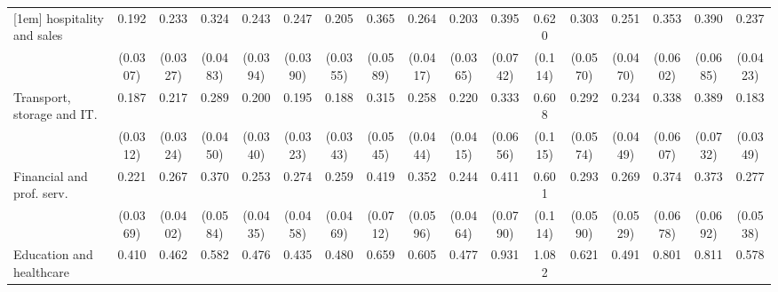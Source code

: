 {\begin{tabular}{l*{16}{c}}
[1em]
hospitality and sales&       0.192\sym{***}&       0.233\sym{***}&       0.324\sym{***}&       0.243\sym{***}&       0.247\sym{***}&       0.205\sym{***}&       0.365\sym{***}&       0.264\sym{***}&       0.203\sym{***}&       0.395\sym{***}&       0.620\sym{**} &       0.303\sym{***}&       0.251\sym{***}&       0.353\sym{***}&       0.390\sym{***}&       0.237\sym{***}\\
                    &    (0.0307)         &    (0.0327)         &    (0.0483)         &    (0.0394)         &    (0.0390)         &    (0.0355)         &    (0.0589)         &    (0.0417)         &    (0.0365)         &    (0.0742)         &     (0.114)         &    (0.0570)         &    (0.0470)         &    (0.0602)         &    (0.0685)         &    (0.0423)         \\
[1em]
Transport, storage and IT.&       0.187\sym{***}&       0.217\sym{***}&       0.289\sym{***}&       0.200\sym{***}&       0.195\sym{***}&       0.188\sym{***}&       0.315\sym{***}&       0.258\sym{***}&       0.220\sym{***}&       0.333\sym{***}&       0.608\sym{**} &       0.292\sym{***}&       0.234\sym{***}&       0.338\sym{***}&       0.389\sym{***}&       0.183\sym{***}\\
                    &    (0.0312)         &    (0.0324)         &    (0.0450)         &    (0.0340)         &    (0.0323)         &    (0.0343)         &    (0.0545)         &    (0.0444)         &    (0.0415)         &    (0.0656)         &     (0.115)         &    (0.0574)         &    (0.0449)         &    (0.0607)         &    (0.0732)         &    (0.0349)         \\
[1em]
Financial and prof. serv.&       0.221\sym{***}&       0.267\sym{***}&       0.370\sym{***}&       0.253\sym{***}&       0.274\sym{***}&       0.259\sym{***}&       0.419\sym{***}&       0.352\sym{***}&       0.244\sym{***}&       0.411\sym{***}&       0.601\sym{**} &       0.293\sym{***}&       0.269\sym{***}&       0.374\sym{***}&       0.373\sym{***}&       0.277\sym{***}\\
                    &    (0.0369)         &    (0.0402)         &    (0.0584)         &    (0.0435)         &    (0.0458)         &    (0.0469)         &    (0.0712)         &    (0.0596)         &    (0.0464)         &    (0.0790)         &     (0.114)         &    (0.0590)         &    (0.0529)         &    (0.0678)         &    (0.0692)         &    (0.0538)         \\
[1em]
Education and healthcare&       0.410\sym{***}&       0.462\sym{***}&       0.582\sym{**} &       0.476\sym{***}&       0.435\sym{***}&       0.480\sym{***}&       0.659\sym{*}  &       0.605\sym{**} &       0.477\sym{***}&       0.931         &       1.082         &       0.621\sym{*}  &       0.491\sym{***}&       0.801         &       0.811         &       0.578\sym{**} \\

\end{tabular}}

